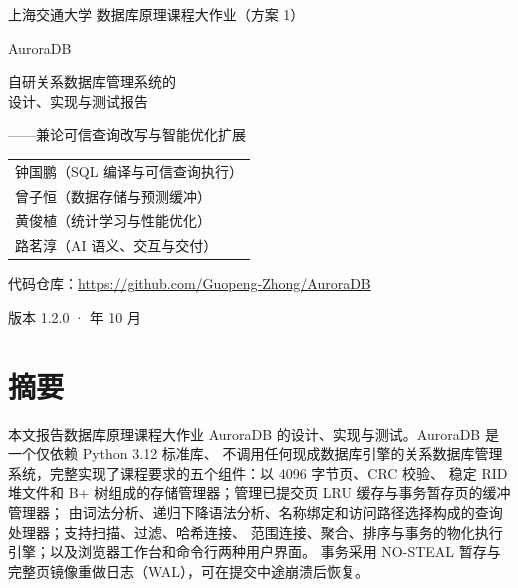 \documentclass[a4paper,zihao=-4,UTF8,fontset=windows,linespread=1.35]{ctexart}
\begin{document}
\begin{titlepage}
\centering
\vspace*{1.2cm}
{\kaishu 上海交通大学 \quad 数据库原理课程大作业（方案 1）\par}
\vspace{2.2cm}
{\heiti AuroraDB\par}
\vspace{0.6cm}
{\heiti 自研关系数据库管理系统的\\[4pt] 设计、实现与测试报告\par}
\vspace{0.8cm}
{\kaishu ——兼论可信查询改写与智能优化扩展\par}
\vspace{2.4cm}
{
\begin{tabular}{l}
\toprule
钟国鹏（SQL 编译与可信查询执行）\\
曾子恒（数据存储与预测缓冲）\\
黄俊植（统计学习与性能优化）\\
路茗淳（AI 语义、交互与交付）\\
\bottomrule
\end{tabular}\par}
\vspace{1.8cm}
{ 代码仓库：\url{https://github.com/Guopeng-Zhong/AuroraDB}\par}
\vspace{0.4cm}
{ 版本 1.2.0 \quad ·  年 10 月\par}
\end{titlepage}

\section*{摘\quad 要}

本文报告数据库原理课程大作业 AuroraDB 的设计、实现与测试。AuroraDB 是一个仅依赖 Python 3.12 标准库、
不调用任何现成数据库引擎的关系数据库管理系统，完整实现了课程要求的五个组件：以 4096 字节页、CRC 校验、
稳定 RID 堆文件和 B+ 树组成的存储管理器；管理已提交页 LRU 缓存与事务暂存页的缓冲管理器；
由词法分析、递归下降语法分析、名称绑定和访问路径选择构成的查询处理器；支持扫描、过滤、哈希连接、
范围连接、聚合、排序与事务的物化执行引擎；以及浏览器工作台和命令行两种用户界面。
事务采用 NO-STEAL 暂存与完整页镜像重做日志（WAL），可在提交中途崩溃后恢复。
\end{document}

